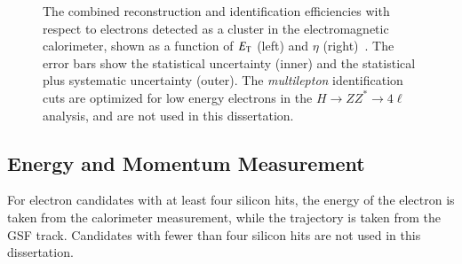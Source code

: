 \begin{figure}[htbp]
{		
	}
	\caption{The combined reconstruction and identification efficiencies with respect to electrons detected as a cluster in the electromagnetic calorimeter, shown as a function of $E_{\mathrm{T}}$ (left) and $\eta$ (right)~\cite{TheATLASCollaboration:2014vz}. The error bars show the statistical uncertainty (inner) and the statistical plus systematic uncertainty (outer). The \emph{multilepton} identification cuts are optimized for low energy electrons in the $H\rightarrow ZZ^*\rightarrow 4\ell$ analysis, and are not used in this dissertation.}
	\label{fig:electron-id-efficiencies}
\end{figure}


\subsection{Energy and Momentum Measurement}\label{sec:reco-electron-energymomentum}
For electron candidates with at least four silicon hits, the energy of the electron is taken from the calorimeter measurement, while the trajectory is taken from the GSF track. Candidates with fewer than four silicon hits are not used in this dissertation.

